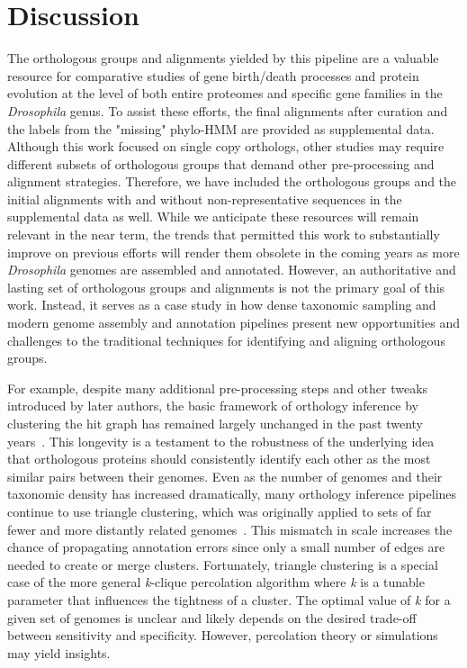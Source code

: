 \documentclass[10pt,letterpaper]{article}
\begin{document}
\section*{Discussion}
The orthologous groups and alignments yielded by this pipeline are a valuable resource for comparative studies of gene birth/death processes and protein evolution at the level of both entire proteomes and specific gene families in the \textit{Drosophila} genus. To assist these efforts, the final alignments after curation and the labels from the "missing" phylo-HMM are provided as supplemental data. Although this work focused on single copy orthologs, other studies may require different subsets of orthologous groups that demand other pre-processing and alignment strategies. Therefore, we have included the orthologous groups and the initial alignments with and without non-representative sequences in the supplemental data as well. While we anticipate these resources will remain relevant in the near term, the trends that permitted this work to substantially improve on previous efforts will render them obsolete in the coming years as more \textit{Drosophila} genomes are assembled and annotated. However, an authoritative and lasting set of orthologous groups and alignments is not the primary goal of this work. Instead, it serves as a case study in how dense taxonomic sampling and modern genome assembly and annotation pipelines present new opportunities and challenges to the traditional techniques for identifying and aligning orthologous groups.

For example, despite many additional pre-processing steps and other tweaks introduced by later authors, the basic framework of orthology inference by clustering the hit graph has remained largely unchanged in the past twenty years~\cite{Remm2001, Li2003, Jensen2007, Linard2011, Emms2015, Train2017, Cosentino2018}. This longevity is a testament to the robustness of the underlying idea that orthologous proteins should consistently identify each other as the most similar pairs between their genomes. Even as the number of genomes and their taxonomic density has increased dramatically, many orthology inference pipelines continue to use triangle clustering, which was originally applied to sets of far fewer and more distantly related genomes~\cite{Tatusov1997}. This mismatch in scale increases the chance of propagating annotation errors since only a small number of edges are needed to create or merge clusters. Fortunately, triangle clustering is a special case of the more general \textit{k}-clique percolation algorithm where \textit{k} is a tunable parameter that influences the tightness of a cluster. The optimal value of \textit{k} for a given set of genomes is unclear and likely depends on the desired trade-off between sensitivity and specificity. However, percolation theory or simulations may yield insights.
\end{document}
